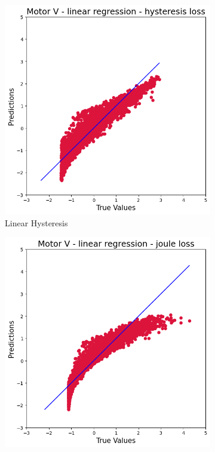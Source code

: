 \documentclass{article}
\begin{document}
\begin{figure}[!htbp]
    \centering
    \begin{subfigure}[b]{0.23\textwidth}
        \centering
        \includegraphics[width=\textwidth]{images/V/linear_hysteresis.png}
        \caption{Linear Hysteresis}
    \end{subfigure}
    \hfill
    \begin{subfigure}[b]{0.23\textwidth}
        \centering
        \includegraphics[width=\textwidth]{images/V/linear_joule.png}

\end{subfigure}
\end{figure}
\end{document}
